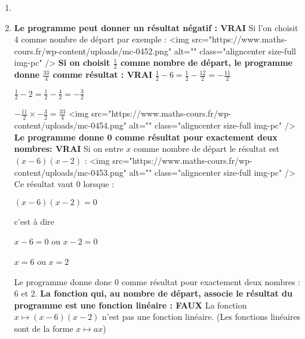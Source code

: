 \begin{corrige}
     \begin{enumerate}
          \item

\begin{center}
\end{center}
          \item
          \textbf{Le programme peut donner un résultat négatif : VRAI}
          Si l'on choisit 4 comme nombre de départ par exemple :
          <img src="https://www.maths-cours.fr/wp-content/uploads/mc-0452.png" alt="" class="aligncenter size-full  img-pc" />
          \textbf{Si on choisit $\frac{1}{2}$ comme nombre de départ, le programme donne $\frac{33}{4}$ comme résultat : VRAI}
          $\frac{1}{2}-6=\frac{1}{2}-\frac{12}{2}=-\frac{11}{2}$
          \par
          $\frac{1}{2}-2=\frac{1}{2}-\frac{4}{2}=-\frac{3}{2}$
          \par
          $-\frac{11}{2}\times -\frac{3}{2}=\frac{33}{4}$
          <img src="https://www.maths-cours.fr/wp-content/uploads/mc-0454.png" alt="" class="aligncenter size-full  img-pc" />
          \textbf{Le programme donne 0 comme résultat pour exactement deux nombres: VRAI}
          Si on entre $x$ comme nombre de départ le résultat est $\left(x-6\right)\left(x-2\right)$ :
          <img src="https://www.maths-cours.fr/wp-content/uploads/mc-0453.png" alt="" class="aligncenter size-full  img-pc" />
          Ce résultat vaut $0$ lorsque :
          \par
          $\left(x-6\right)\left(x-2\right)=0$
          \par
          c'est à dire
          \par
          $x-6=0$ ou $x-2=0$
          \par
          $x=6$ ou $x=2$
          \par
          Le programme donne  donc 0 comme résultat pour exactement deux nombres : 6 et 2.
          \textbf{La fonction qui, au nombre de départ, associe le résultat du programme est une fonction linéaire : FAUX}
          La fonction $x\mapsto \left(x-6\right)\left(x-2\right)$ n'est pas une fonction linéaire. (Les fonctions linéaires sont de la forme $x\mapsto ax$)
     \end{enumerate}
\end{corrige}
